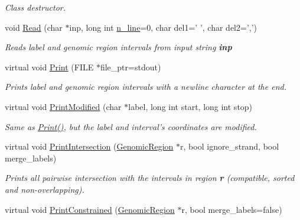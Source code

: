 \begin{DoxyCompactItemize}
\begin{DoxyCompactList}\small\item\em Class destructor. \end{DoxyCompactList}\item 
\hypertarget{classGenomicRegion_afd188daab9b4e97ef66883d6971fe103}{
void \hyperlink{classGenomicRegion_afd188daab9b4e97ef66883d6971fe103}{Read} (char $\ast$inp, long int \hyperlink{classGenomicRegion_aefe2255aeed5338060190ded05cb9c0c}{n\_\-line}=0, char del1=' ', char del2=',')}
\label{classGenomicRegion_afd188daab9b4e97ef66883d6971fe103}

\begin{DoxyCompactList}\small\item\em Reads label and genomic region intervals from input string {\bfseries inp} \end{DoxyCompactList}\item 
\hypertarget{classGenomicRegion_a40397d1fab7b00e5f04b9f7e52f0114e}{
virtual void \hyperlink{classGenomicRegion_a40397d1fab7b00e5f04b9f7e52f0114e}{Print} (FILE $\ast$file\_\-ptr=stdout)}
\label{classGenomicRegion_a40397d1fab7b00e5f04b9f7e52f0114e}

\begin{DoxyCompactList}\small\item\em Prints label and genomic region intervals with a newline character at the end. \end{DoxyCompactList}\item 
\hypertarget{classGenomicRegion_ab9ea31af7fbb32f206efe0e64533a5be}{
virtual void \hyperlink{classGenomicRegion_ab9ea31af7fbb32f206efe0e64533a5be}{PrintModified} (char $\ast$label, long int start, long int stop)}
\label{classGenomicRegion_ab9ea31af7fbb32f206efe0e64533a5be}

\begin{DoxyCompactList}\small\item\em Same as \hyperlink{classGenomicRegion_a40397d1fab7b00e5f04b9f7e52f0114e}{Print()}, but the label and interval's coordinates are modified. \end{DoxyCompactList}\item 
\hypertarget{classGenomicRegion_aba987d40590874eebd1dd8bb0c02bdc8}{
virtual void \hyperlink{classGenomicRegion_aba987d40590874eebd1dd8bb0c02bdc8}{PrintIntersection} (\hyperlink{classGenomicRegion}{GenomicRegion} $\ast$r, bool ignore\_\-strand, bool merge\_\-labels)}
\label{classGenomicRegion_aba987d40590874eebd1dd8bb0c02bdc8}

\begin{DoxyCompactList}\small\item\em Prints all pairwise intersection with the intervals in region {\bfseries r} (compatible, sorted and non-\/overlapping). \end{DoxyCompactList}\item 
\hypertarget{classGenomicRegion_acfe5347d9c92da801ce7e97416fc8758}{
virtual void \hyperlink{classGenomicRegion_acfe5347d9c92da801ce7e97416fc8758}{PrintConstrained} (\hyperlink{classGenomicRegion}{GenomicRegion} $\ast$r, bool merge\_\-labels=false)}
\label{classGenomicRegion_acfe5347d9c92da801ce7e97416fc8758}


\end{DoxyCompactItemize}

